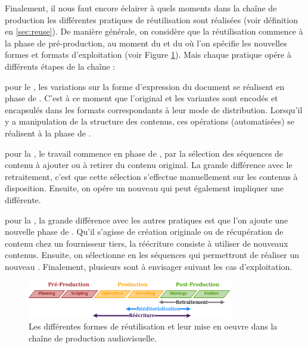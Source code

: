 Finalement, il nous faut encore éclairer à quels moments dans la chaîne de production les différentes pratiques de réutilisation sont réalisées (voir définition en \ref{sec:reuse}).
De manière générale, on considère que la réutilisation commence à la phase de pré-production, au moment du  et du  où l'on spécifie les nouvelles formes et formats d'exploitation (voir Figure \ref{img:intro:reutilisation}). 
Mais chaque pratique opére à différents étapes de la chaîne :
\begin{liste}
	\item pour le , les variations sur la forme d'expression du document se réalisent en phase de . 
	C'est à ce moment que l'original et les variantes sont encodés et encapsulés dans les formats correspondants à leur mode de distribution. 
	Lorsqu'il y a manipulation de la structure des contenus, ces opérations (automatisées) se réalisent à la phase de .

	\item pour la , le travail commence en phase de , par la sélection des séquences de contenu à ajouter ou à retirer du contenu original. 
	La grande différence avec le retraitement, c'est que cette sélection s'effectue manuellement sur les contenus à disposition. 
	Ensuite, on opére un nouveau  qui peut également impliquer une  différente.

	\item pour la , la grande différence avec les autres pratiques est que l'on ajoute une nouvelle phase de . 
	Qu'il s'agisse de création originale ou de récupération de contenu chez un fournisseur tiers, la réécriture consiste à utiliser de nouveaux contenus. 
	Ensuite, on sélectionne en  les séquences qui permettront de réaliser un nouveau . 
	Finalement, plusieurs  sont à envisager suivant les cas d'exploitation.
\end{liste}

\begin{figure}[ht!]
\centering
\includegraphics[width=0.8\textwidth]{images/Workflow-Reuse-v1.png}
\caption{Les différentes formes de réutilisation et leur mise en oeuvre dans la chaîne de production audiovisuelle.}
\label{img:intro:reutilisation}
\end{figure}








